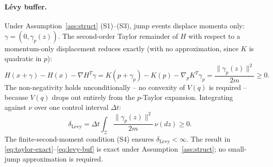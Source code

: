 \documentclass[11pt]{article}
\begin{document}
\paragraph{L\'{e}vy buffer.} Under Assumption~\ref{ass:struct} (S1)--(S3), jump events displace
momenta only: $\gamma=(0,\gamma_p(z))$. The second-order Taylor remainder of $H$ with respect
to a momentum-only displacement reduces exactly (with no approximation, since $K$ is
quadratic in $p$):
\begin{equation}
H(x+\gamma)-H(x)-\nabla H^T\gamma
= K(p+\gamma_p)-K(p)-\nabla_p K^T\gamma_p
= \frac{\|\gamma_p(z)\|^2}{2m}\ge 0.
\label{eq:taylor-exact}
\end{equation}
The non-negativity holds unconditionally -- no convexity of $V(q)$ is required -- because
$V(q)$ drops out entirely from the $p$-Taylor expansion. Integrating against $\nu$ over one
control interval $\Delta t$:
\begin{equation}
\delta_{\mathrm{L\acute{e}vy}} = \Delta t\int_{\mathcal{Z}}\frac{\|\gamma_p(z)\|^2}{2m}\,\nu(dz)\ge 0.
\label{eq:levy-buf}
\end{equation}
The finite-second-moment condition (S4) ensures $\delta_{\mathrm{L\acute{e}vy}}<\infty$.
The result in \eqref{eq:taylor-exact}--\eqref{eq:levy-buf} is exact under
Assumption~\ref{ass:struct}; no small-jump approximation is required.
\end{document}

